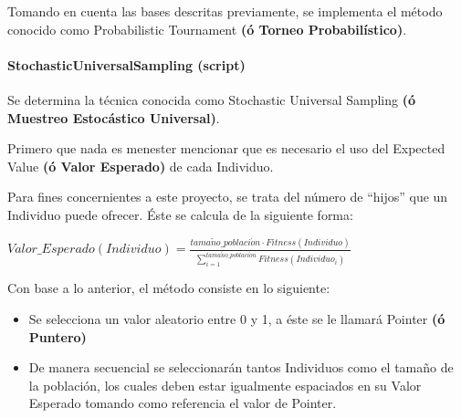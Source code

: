 \documentclass[letterpaper,10pt,english]{sphinxmanual}
\begin{document}
\begin{fulllineitems}
\label{Model/Operator/Selection/ProbabilisticTournament:Model.Operator.Selection.ProbabilisticTournament.execute_selection_technique}
Tomando en cuenta las bases descritas previamente, se implementa
el método conocido como Probabilistic Tournament \textbf{(ó Torneo Probabilístico)}.

\end{fulllineitems}



\paragraph{StochasticUniversalSampling (script)}
\label{Model/Operator/Selection/StochasticUniversalSampling::doc}\label{Model/Operator/Selection/StochasticUniversalSampling:stochasticuniversalsampling-script}
\begin{DUlineblock}{0em}
\item[] Se determina la técnica conocida como Stochastic Universal Sampling
\textbf{(ó Muestreo Estocástico Universal)}.
\item[] Primero que nada es menester mencionar que es necesario el uso del Expected Value \textbf{(ó Valor Esperado)} de cada Individuo.
\item[] Para fines concernientes a este proyecto, se trata del número de ``hijos'' que un Individuo puede ofrecer. Éste se calcula de la siguiente forma:
\end{DUlineblock}

\begin{center}\(Valor\_Esperado(Individuo) = \frac{tama\tilde{n}o\_poblaci\acute{o}n \cdot Fitness(Individuo)}{\sum_{i=1}^{tama\tilde{n}o\_poblaci\acute{o}n}Fitness(Individuo_i)}\)
\end{center}
\begin{DUlineblock}{0em}
\item[] Con base a lo anterior, el método consiste en lo siguiente:
\end{DUlineblock}
\begin{itemize}
\item {} 
Se selecciona un valor aleatorio entre 0 y 1, a éste se le llamará Pointer \textbf{(ó Puntero)}

\item {} 
De manera secuencial se seleccionarán tantos Individuos como el tamaño de la población, los cuales deben estar igualmente espaciados en su Valor Esperado tomando como referencia el valor de Pointer.

\end{itemize}
\end{document}
